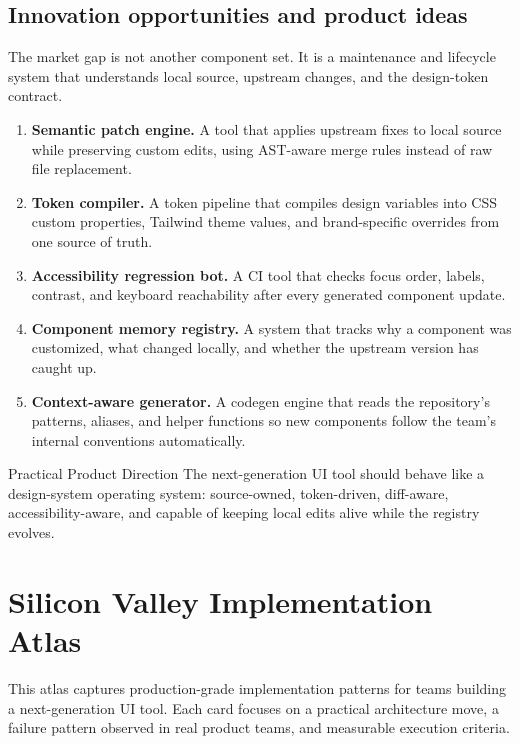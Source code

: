 \documentclass[11pt,twoside,a4paper]{article}
\begin{document}
\subsection{Innovation opportunities and product ideas}
The market gap is not another component set. It is a maintenance and lifecycle system that understands local source, upstream changes, and the design-token contract.

\begin{enumerate}[leftmargin=*, itemsep=0.45em]
  \item \textbf{Semantic patch engine.} A tool that applies upstream fixes to local source while preserving custom edits, using AST-aware merge rules instead of raw file replacement.
  \item \textbf{Token compiler.} A token pipeline that compiles design variables into CSS custom properties, Tailwind theme values, and brand-specific overrides from one source of truth.
  \item \textbf{Accessibility regression bot.} A CI tool that checks focus order, labels, contrast, and keyboard reachability after every generated component update.
  \item \textbf{Component memory registry.} A system that tracks why a component was customized, what changed locally, and whether the upstream version has caught up.
  \item \textbf{Context-aware generator.} A codegen engine that reads the repository's patterns, aliases, and helper functions so new components follow the team's internal conventions automatically.
\end{enumerate}

\begin{highlightbox}{Practical Product Direction}
The next-generation UI tool should behave like a design-system operating system: source-owned, token-driven, diff-aware, accessibility-aware, and capable of keeping local edits alive while the registry evolves.
\end{highlightbox}

\section{Silicon Valley Implementation Atlas}
This atlas captures production-grade implementation patterns for teams building a next-generation UI tool. Each card focuses on a practical architecture move, a failure pattern observed in real product teams, and measurable execution criteria.
\end{document}
